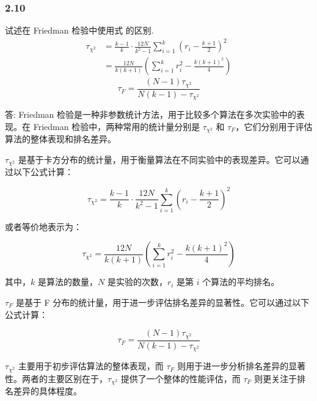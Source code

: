 \subsubsection*{2.10}
试述在 Friedman 检验中使用式 的区别.
\begin{align*}
    \tau_{\chi^2} &= \frac{k-1}{k} \cdot \frac{12N}{k^2-1} \sum_{i=1}^{k} \left( r_i - \frac{k+1}{2} \right)^2 \\
    &= \frac{12N}{k(k+1)} \left( \sum_{i=1}^{k} r_i^2 - \frac{k(k+1)^2}{4} \right)
\end{align*}
\begin{equation*}
    \tau_F = \frac{(N-1) \tau_{\chi^2}}{N(k-1) - \tau_{\chi^2}}
\end{equation*}
\par 答:
Friedman 检验是一种非参数统计方法，用于比较多个算法在多次实验中的表现。在 Friedman 检验中，两种常用的统计量分别是 $\tau_{\chi^2}$ 和 $\tau_F$，它们分别用于评估算法的整体表现和排名差异。

$\tau_{\chi^2}$ 是基于卡方分布的统计量，用于衡量算法在不同实验中的表现差异。它可以通过以下公式计算：

\[
\tau_{\chi^2} = \frac{k-1}{k} \cdot \frac{12N}{k^2-1} \sum_{i=1}^{k} \left( r_i - \frac{k+1}{2} \right)^2
\]

或者等价地表示为：

\[
\tau_{\chi^2} = \frac{12N}{k(k+1)} \left( \sum_{i=1}^{k} r_i^2 - \frac{k(k+1)^2}{4} \right)
\]

其中，$k$ 是算法的数量，$N$ 是实验的次数，$r_i$ 是第 $i$ 个算法的平均排名。

$\tau_F$ 是基于 F 分布的统计量，用于进一步评估排名差异的显著性。它可以通过以下公式计算：

\[
\tau_F = \frac{(N-1) \tau_{\chi^2}}{N(k-1) - \tau_{\chi^2}}
\]

$\tau_{\chi^2}$ 主要用于初步评估算法的整体表现，而 $\tau_F$ 则用于进一步分析排名差异的显著性。两者的主要区别在于，$\tau_{\chi^2}$ 提供了一个整体的性能评估，而 $\tau_F$ 则更关注于排名差异的具体程度。
\newpage
